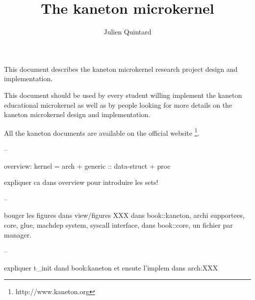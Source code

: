%
%
%
%
%
%

%
%

%
%

\def\path{../..}

%
%



%
%

\rhead{}

%
%

\title{The kaneton microkernel
       \logos}

%
%

\author{\small{Julien Quintard}}

%
%



%
%

\maketitle

%
%

This document describes the kaneton microkernel research project design
and implementation.

\-

This document should be used by every student willing implement the
kaneton educational microkernel as well as by people looking for more
details on the kaneton microkernel design and implementation.

\-

All the kaneton documents are available on
the official website
  \footnote{http://www.kaneton.org}.

%
%

\toc

%
%




% 






--

overview: kernel = arch + generic :: data-struct + proc

expliquer ca dans overview pour introduire les sets!

--

bouger les figures dans view/figures
XXX dans book::kaneton, archi supportees, core, glue, machdep system, syscall
    interface, dans book::core, un fichier par manager.

--

expliquer t_init dand book:kaneton et ensute l'implem dans arch:XXX
